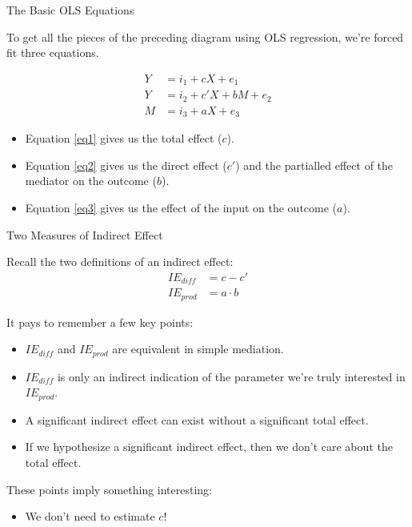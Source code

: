 \documentclass{beamer}
\newcommand{\vb}[0]{\vspace{6pt}}
\newcommand{\vc}[0]{\vspace{3pt}}
\begin{document}
\begin{frame}{The Basic OLS Equations}

  To get all the pieces of the preceding diagram using OLS regression,
  we're forced fit three equations.

\begin{align}
Y &= i_1 + cX + e_1 \label{eq1}\\
Y &= i_2 + c'X + bM + e_2 \label{eq2}\\
M &= i_3 + aX + e_3 \label{eq3}
\end{align}

\begin{itemize}
\item Equation \ref{eq1} gives us the total effect ($c$).
  \vb
\item Equation \ref{eq2} gives us the direct effect ($c'$) and the
  partialled effect of the mediator on the outcome ($b$).
  \vb
\item Equation \ref{eq3} gives us the effect of the input on the
  outcome ($a$).
\end{itemize}

\end{frame}



\begin{frame}[shrink = 5]{Two Measures of Indirect Effect}

  Recall the two definitions of an indirect effect:
  \begin{align}
    IE_{diff} &= c - c'\\
    IE_{prod} &= a \cdot b
  \end{align}

  It pays to remember a few key points:
  \vc
  \begin{itemize}
  \item $IE_{diff}$ and $IE_{prod}$ are equivalent in simple
    mediation.
    \vb
  \item $IE_{diff}$ is only an indirect indication of the parameter
    we're truly interested in $IE_{prod}$.
    \vb
  \item A significant indirect effect can exist without a significant
    total effect.
    \vb
  \item If we hypothesize a significant indirect effect, then we don't
    care about the total effect.
  \end{itemize}
  \vb
  These points imply something interesting:
  \vc
  \begin{itemize}
    \item We don't need to estimate $c$!
  \end{itemize}

\end{frame}
\end{document}
